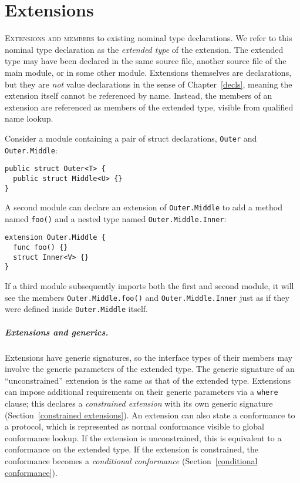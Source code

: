 \documentclass[../generics]{subfiles}
\begin{document}
\chapter{Extensions}\label{extensions}

\lettrine{E}{xtensions add members} to existing nominal type declarations. We refer to this nominal type declaration as the \emph{extended type} of the extension. The extended type may have been declared in the same source file, another source file of the main module, or in some other module. Extensions themselves are declarations, but they are \emph{not} value declarations in the sense of Chapter~\ref{decls}, meaning the extension itself cannot be referenced by name. Instead, the members of an extension are referenced as members of the extended type, visible from qualified name lookup.

Consider a module containing a pair of struct declarations, \texttt{Outer} and \texttt{Outer.Middle}:
\begin{Verbatim}
public struct Outer<T> {
  public struct Middle<U> {}
}
\end{Verbatim}
A second module can declare an extension of \texttt{Outer.Middle} to add a method named \texttt{foo()} and a nested type named \texttt{Outer.Middle.Inner}:
\begin{Verbatim}
extension Outer.Middle {
  func foo() {}
  struct Inner<V> {}
}
\end{Verbatim}
If a third module subsequently imports both the first and second module, it will see the members \texttt{Outer.Middle.foo()} and \texttt{Outer.Middle.Inner} just as if they were defined inside \texttt{Outer.Middle} itself. 

\paragraph{Extensions and generics.}
Extensions have generic signatures, so the interface types of their members may involve the generic parameters of the extended type. The generic signature of an ``unconstrained'' extension is the same as that of the extended type. Extensions can impose additional requirements on their generic parameters via a \texttt{where} clause; this declares a \emph{constrained extension} with its own generic signature (Section~\ref{constrained extensions}). An extension can also state a conformance to a protocol, which is represented as normal conformance visible to global conformance lookup. If the extension is unconstrained, this is equivalent to a conformance on the extended type. If the extension is constrained, the conformance becomes a \emph{conditional conformance} (Section~\ref{conditional conformance}).
\end{document}
